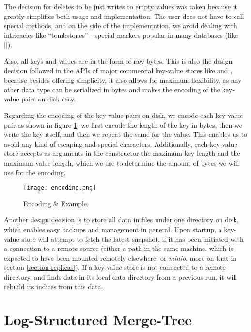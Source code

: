 The decision for deletes to be just writes to empty values was taken because it greatly simplifies both usage and implementation. The user does not have to call special methods, and on the side of the implementation, we avoid dealing with intricacies like ``tombstones'' - special markers popular in many databases (like [\cite{myrocks}]).

Also, all keys and values are in the form of raw bytes.
This is also the design decision followed in the APIs of major commercial key-value stores like \cite{rocksdb} and \cite{redis}, because besides offering simplicity, it also allows for maximum flexibility, as any other data type can be serialized in bytes and makes the encoding of the key-value pairs on disk easy.

Regarding the encoding of the key-value pairs on disk, we encode each key-value pair as shown in figure \ref{fig:encoding}: we first encode the length of the key in bytes, then we write the key itself, and then we repeat the same for the value. This enables us to avoid any kind of escaping and special characters. Additionally, each key-value store accepts as arguments in the constructor the maximum key length and the maximum value length, which we use to determine the amount of bytes we will use for the encoding.

\begin{figure}[h]
    \centering
    \texttt{[image: encoding.png]}
    \caption{Encoding \& Example.}
    \label{fig:encoding}
\end{figure}

Another design decision is to store all data in files under one directory on disk, which enables easy backups and management in general. Upon startup, a key-value store will attempt to fetch the latest snapshot, if it has been initiated with a connection to a remote source (either a path in the same machine, which is expected to have been mounted remotely elsewhere, or \textit{minio}, more on that in section \ref{section-replicas}). If a key-value store is not connected to a remote directory, and finds data in its local data directory from a previous run, it will rebuild its indices from this data.


\section{Log-Structured Merge-Tree}

